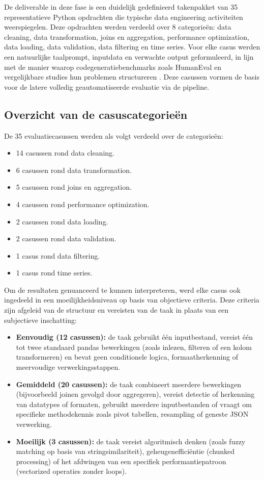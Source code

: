 De deliverable in deze fase is een duidelijk gedefinieerd takenpakket van 35 representatieve Python opdrachten die typische data engineering activiteiten weerspiegelen. Deze opdrachten werden verdeeld over 8 categorieën: data cleaning, data transformation, joins en aggregation, performance optimization, data loading, data validation, data filtering en time series. Voor elke casus werden een natuurlijke taalprompt, inputdata en verwachte output geformuleerd, in lijn met de manier waarop codegeneratiebenchmarks zoals HumanEval en vergelijkbare studies hun problemen structureren \autocite{Ni2024,LopezEspejel2025}. Deze casussen vormen de basis voor de latere volledig geautomatiseerde evaluatie via de pipeline.

\subsection{Overzicht van de casuscategorieën}

De 35 evaluatiecasussen werden als volgt verdeeld over de categorieën:

\begin{itemize}
    \item 14 casussen rond data cleaning.
    \item 6 casussen rond data transformation.
    \item 5 casussen rond joins en aggregation.
    \item 4 casussen rond performance optimization.
    \item 2 casussen rond data loading.
    \item 2 casussen rond data validation.
    \item 1 casus rond data filtering.
    \item 1 casus rond time series.
\end{itemize}

Om de resultaten genuanceerd te kunnen interpreteren, werd elke casus ook ingedeeld in een moeilijkheidsniveau op basis van objectieve criteria. Deze criteria zijn afgeleid van de structuur en vereisten van de taak in plaats van een subjectieve inschatting:

\begin{itemize}
    \item \textbf{Eenvoudig (12 casussen):} de taak gebruikt één inputbestand, vereist één tot twee standaard pandas bewerkingen (zoals inlezen, filteren of een kolom transformeren) en bevat geen conditionele logica, formaatherkenning of meervoudige verwerkingsstappen.
    \item \textbf{Gemiddeld (20 casussen):} de taak combineert meerdere bewerkingen (bijvoorbeeld joinen gevolgd door aggregeren), vereist detectie of herkenning van datatypes of formaten, gebruikt meerdere inputbestanden of vraagt om specifieke methodekennis zoals pivot tabellen, resampling of geneste JSON verwerking.
    \item \textbf{Moeilijk (3 casussen):} de taak vereist algoritmisch denken (zoals fuzzy matching op basis van stringsimilariteit), geheugenefficiëntie (chunked processing) of het afdwingen van een specifiek performantiepatroon (vectorized operaties zonder loops).
\end{itemize}

